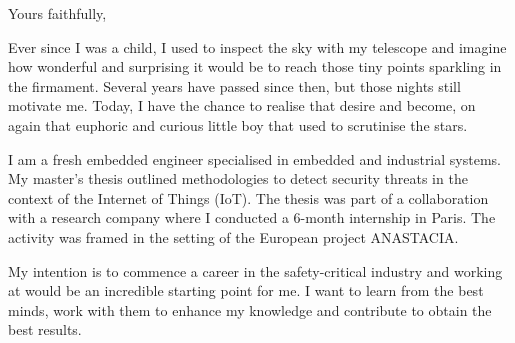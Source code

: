 \documentclass[12pt,a4paper,sans]{moderncv}        %
\begin{document}
\closing{Yours faithfully,}
\makelettertitle
\justifying

Ever since I was a child, I used to inspect the sky with my telescope and imagine how wonderful and surprising it would be to reach those tiny points sparkling in the firmament. Several years have passed since then, but those nights still motivate me. Today, I have the chance to realise that desire and become, on again that euphoric and curious little boy that used to scrutinise the stars. 


I am a fresh embedded engineer specialised in embedded and industrial systems. My master’s thesis outlined methodologies to detect security threats in the context of the Internet of Things (IoT). The thesis was part of a collaboration with a research company where I conducted a 6-month internship in Paris. The activity was framed in the setting of the European project ANASTACIA.  



My intention is to commence a career in the safety-critical industry and working at \company{} would be an incredible starting point for me. I want to learn from the best minds, work with them to enhance my knowledge and contribute to obtain the best results.
\end{document}
